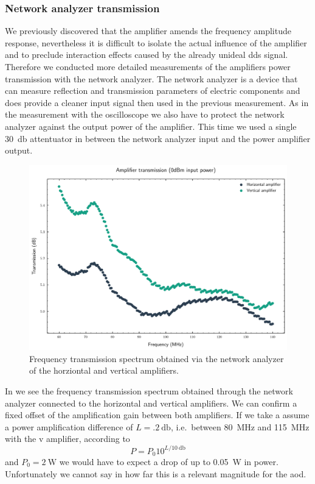 \subsubsection{Network analyzer transmission}

We previously discovered that the amplifier amends the frequency amplitude
response, nevertheless it is difficult to isolate the actual influence of
the amplifier and to preclude interaction effects caused by the already
unideal \gls{dds} signal. Therefore we conducted more detailed measurements
of the amplifiers power transmission with the network analyzer. The network
analyzer is a device that can measure reflection and transmission parameters
of electric components and does provide a cleaner input signal then used in
the previous measurement. As in the measurement with the oscilloscope we also
have to protect the network analyzer against the output power of the
amplifier. This time we used a single \SI{30}{\decibel} attentuator in between
the network analyzer input and the power amplifier output.
\begin{figure}[htb]
  \centering
  \includegraphics[width=.9\textwidth]{../figure/signal/amplification/transmission.pdf}
  \caption{Frequency transmission spectrum obtained via the network analyzer
    of the horziontal and vertical amplifiers.
  }\label{fig:signal_amplification_spectrum}
\end{figure}
In  we see the frequency transmission
spectrum obtained through the network analyzer connected to the horizontal
and vertical amplifiers. We can confirm a fixed offset of the amplification
gain between both amplifiers. If we take a assume a power amplification
difference of $L=\SI{.2}{\decibel}$, i.e.\ between \SI{80}{\mega\hertz} and
\SI{115}{\mega\hertz} with the \gls{v} amplifier, according to
\begin{equation}
  P
  =
  P_0 10^{L/\SI{10}{\decibel}}
  \label{eq:power_gain_decibel}
\end{equation}
and $P_0=\SI{2}{\watt}$ we would have to expect a drop of up to
\SI{.05}{\watt} in power. Unfortunately we cannot say in how far this is
a relevant magnitude for the \gls{aod}.

